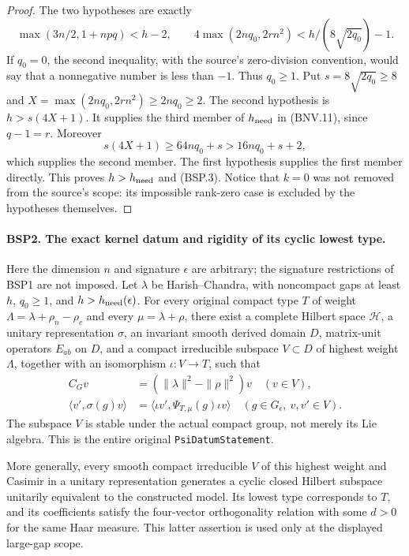 \begin{proof}
The two hypotheses are exactly
\[
 \max(3n/2,1+npq)<h-2,\qquad
 4\max(2nq_0,2rn^2)<h/(8\sqrt{2q_0})-1.
\]
If $q_0=0$, the second inequality, with the source's zero-division
convention, would say that a nonnegative number is less than $-1$.
Thus $q_0\ge1$.  Put $s=8\sqrt{2q_0}\ge8$ and
$X=\max(2nq_0,2rn^2)\ge2nq_0\ge2$.
The second hypothesis is $h>s(4X+1)$.
It supplies the third member of $h_{\rm need}$ in (BNV.11), since
$q-1=r$.  Moreover
\[
 s(4X+1)\ge64nq_0+s>16nq_0+s+2,
\]
which supplies the second member.  The first hypothesis supplies the
first member directly.  This proves $h>h_{\rm need}$ and (BSP.3).
Notice that $k=0$ was not removed from the source's scope: its impossible
rank-zero case is excluded by the hypotheses themselves.
\end{proof}

\paragraph{BSP2. The exact kernel datum and rigidity of its cyclic lowest type.}
\label{claim:BSP2}
Here the dimension $n$ and signature $\epsilon$ are arbitrary; the
signature restrictions of BSP1 are not imposed.
Let $\lambda$ be Harish--Chandra, with noncompact gaps at least $h$,
$q_0\ge1$, and $h>h_{\rm need}(\epsilon)$.
For every original compact type $T$ of weight
$\Lambda=\lambda+\rho_n-\rho_c$ and every $\mu=\lambda+\rho$, there
exist a complete Hilbert space $\mathcal H$, a unitary representation
$\sigma$, an invariant smooth derived domain $D$, matrix-unit operators
$E_{ab}$ on $D$, and a compact irreducible subspace $V\subset D$ of
highest weight $\Lambda$, together with an isomorphism $\iota:V\to T$,
such that
\[
 \begin{split}
 C_Gv&=(\|\lambda\|^2-\|\rho\|^2)v\quad(v\in V),\\
 \langle v',\sigma(g)v\rangle
   &=\langle\iota v',\Psi_{T,\mu}(g)\iota v\rangle
       \quad(g\in G_\epsilon,\ v,v'\in V).
 \end{split}
 \tag{BSP.4}
\]
The subspace $V$ is stable under the actual compact group, not merely its
Lie algebra.  This is the entire original \texttt{PsiDatumStatement}.

More generally, every smooth compact irreducible $V$ of this highest
weight and Casimir in a unitary representation generates a cyclic closed
Hilbert subspace unitarily equivalent to the constructed model.
Its lowest type corresponds to $T$, and its coefficients satisfy the
four-vector orthogonality relation with some $d>0$ for the same Haar
measure.  This latter assertion is used only at the displayed
large-gap scope.

